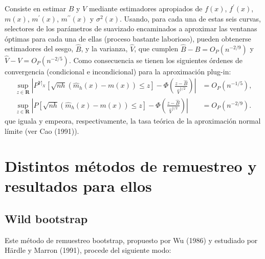 \documentclass[
]{book}
\theoremstyle{definition}
\theoremstyle{definition}
\theoremstyle{definition}
\theoremstyle{remark}
\begin{document}
Consiste en estimar \(B\) y \(V\) mediante estimadores apropiados de
\(f\left(x \right)\), \(f^{\prime}\left( x \right)\), \(m\left( x \right)\),
\(m^{\prime}\left( x \right)\), \(m^{\prime \prime }\left( x \right)\) y
\(\sigma^2\left( x \right)\). Usando, para cada una de estas seis curvas,
selectores de los parámetros de suavizado encaminados a aproximar las
ventanas óptimas para cada una de ellas (proceso bastante laborioso),
pueden obtenerse estimadores del sesgo, \(\hat{B}\), y la varianza,
\(\hat{V}\), que cumplen \(\hat{B}-B=O_{P}\left( n^{-2/9} \right)\) y
\(\hat{V}-V=O_{P}\left( n^{-2/5} \right)\).
Como consecuencia se tienen los siguientes órdenes de convergencia
(condicional e incondicional) para la aproximación plug-in:
\[\begin{aligned}
\sup_{z\in \boldsymbol{R}}\left\vert P^{\left. Y\right\vert _{X}}\left[ 
\sqrt{nh}\left( \hat{m}_{h}\left( x \right) -m\left( x \right) \right) \leq z
\right] -\Phi \left( \frac{z-\hat{B}}{\hat{V}^{1/2}} \right) \right\vert
&= O_{P}\left( n^{-1/5} \right), \\
\sup_{z\in \boldsymbol{R}}\left\vert P\left[ \sqrt{nh}\left( \hat{m}
_{h}\left( x \right) -m\left( x \right) \right) \leq z\right] -\Phi \left( 
\frac{z-\hat{B}}{\hat{V}^{1/2}} \right) \right\vert &= O_{P}\left(
n^{-2/9} \right).
\end{aligned}\]
que iguala y empeora, respectivamente,
la tasa teórica de la aproximación normal límite (ver Cao (1991)).

\hypertarget{distintos-muxe9todos-de-remuestreo-y-resultados-para-ellos}{%
\section{Distintos métodos de remuestreo y resultados para ellos}\label{distintos-muxe9todos-de-remuestreo-y-resultados-para-ellos}}

\hypertarget{wild-bootstrap}{%
\subsection{Wild bootstrap}\label{wild-bootstrap}}

Este método de remuestreo bootstrap, propuesto por Wu (1986) y estudiado
por Härdle y Marron (1991), procede del siguiente modo:
\end{document}
